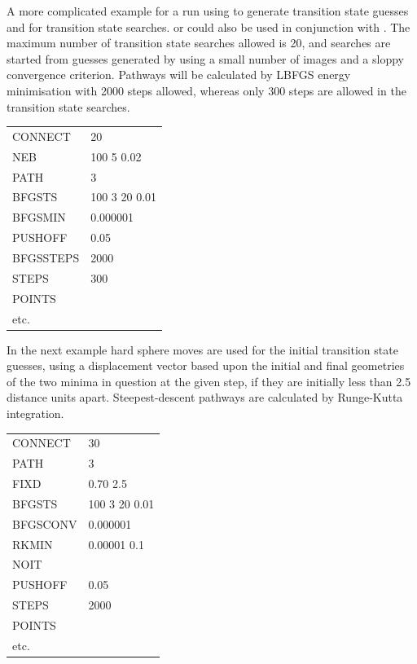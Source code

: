 {{{\noindent A more complicated example for a  run using  to generate transition
state guesses and {} for transition state searches. {}  or 
{} could also be used in conjunction with {}. The maximum number of 
transition state searches allowed is 20, and {} searches are started from 
guesses generated by  using a small number of images and a sloppy convergence
criterion. Pathways will be calculated by LBFGS energy minimisation with 2000 steps allowed, 
whereas only 300 steps are allowed in the transition state searches.

\medskip
\begin{tabular}{ll}
CONNECT &  20 \\
NEB     &  100 5 0.02 \\
PATH    &  3 \\
BFGSTS  &  100 3 20 0.01  \\
BFGSMIN & 0.000001 \\
PUSHOFF  & 0.05 \\
BFGSSTEPS & 2000 \\
STEPS     & 300 \\
POINTS & \\
etc. & \\
\end{tabular}

\noindent In the next example hard sphere moves are used for the initial transition state guesses, using a 
displacement vector based upon the initial and final geometries of the two minima in question 
at the given step, if they are initially less than 2.5 distance units
apart. Steepest-descent pathways are calculated by Runge-Kutta integration.

\medskip
\begin{tabular}{ll}
CONNECT & 30 \\
PATH   &  3 \\
FIXD & 0.70 2.5 \\
BFGSTS  & 100 3 20 0.01 \\
BFGSCONV & 0.000001 \\
RKMIN & 0.00001 0.1 \\
NOIT & \\
PUSHOFF & 0.05 \\
STEPS     & 2000 \\
POINTS & \\
etc. & \\
\end{tabular}

}}}
